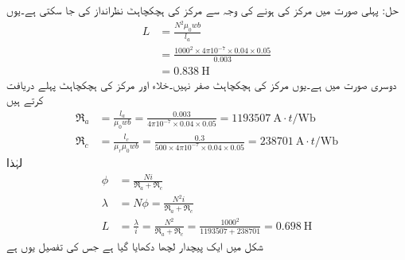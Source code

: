حل:
	پہلی صورت میں مرکز کی  ہونے کی وجہ سے مرکز کی ہچکچاہٹ نظرانداز کی جا سکتی ہے۔یوں
\begin{align*}
L&=\frac{N^2 \mu_0 w b}{l_a}\\
&=\frac{1000^2 \times 4 \pi 10^{-7} \times 0.04 \times 0.05}{0.003}\\
&=\SI{0.838}{\henry}
\end{align*}
	دوسری صورت میں  ہے۔یوں مرکز کی ہچکچاہٹ صفر نہیں۔خلاء اور مرکز کی ہچکچاہٹ پہلے دریافت کرتے ہیں
\begin{align*}
\Re_a&=\frac{l_a}{\mu_0 w b}=\frac{0.003}{4\pi 10^{-7} \times 0.04 \times 0.05}=\SI{1193507}{\ampere \cdot t \per \weber}\\
\Re_c&=\frac{l_c}{\mu_r \mu_0 w b}=\frac{0.3}{500 \times 4\pi 10^{-7} \times 0.04 \times 0.05}=\SI{238701}{\ampere \cdot t \per \weber}
\end{align*}
لہٰذا
\begin{align*}
\phi&=\frac{N i}{\Re_a+\Re_c}\\
\lambda &= N \phi = \frac{N^2 i}{\Re_a+\Re_c}\\
L&=\frac{\lambda}{i}=\frac{N^2}{\Re_a+\Re_c}=\frac{1000^2}{1193507+238701}=\SI{0.698}{\henry}
\end{align*}
%
شکل  میں ایک پیچدار لچھا دکھایا گیا ہے جس کی تفصیل یوں ہے


